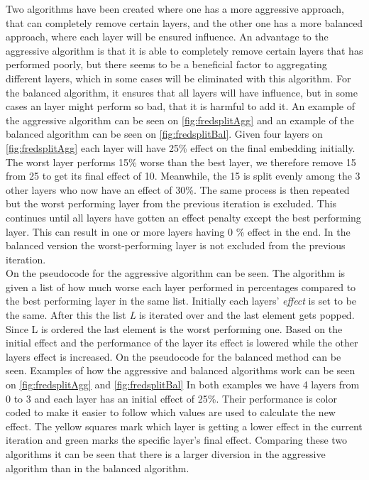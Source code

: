 Two algorithms have been created where one has a more aggressive approach, that can completely remove certain layers, and the other one has a more balanced approach, where each layer will be ensured influence.
An advantage to the aggressive algorithm is that it is able to completely remove certain layers that has performed poorly, but there seems to be a beneficial factor to aggregating different layers, which in some cases will be eliminated with this algorithm.
For the balanced algorithm, it ensures that all layers will have influence, but in some cases an layer might perform so bad, that it is harmful to add it.
An example of the aggressive algorithm can be seen on \autoref{fig:fredsplitAgg} and an example of the balanced algorithm can be seen on \autoref{fig:fredsplitBal}.
Given four layers on \autoref{fig:fredsplitAgg} each layer will have 25\% effect on the final embedding initially.
The worst layer performs 15\% worse than the best layer, we therefore remove 15 from 25 to get its final effect of 10.
Meanwhile, the 15 is split evenly among the 3 other layers who now have an effect of 30\%.
The same process is then repeated but the worst performing layer from the previous iteration is excluded.
This continues until all layers have gotten an effect penalty except the best performing layer.
This can result in one or more layers having 0 \% effect in the end.
In the balanced version the worst-performing layer is not excluded from the previous iteration.
\\
On  the pseudocode for the aggressive algorithm can be seen.
The algorithm is given a list of how much worse each layer performed in percentages compared to the best performing layer in the same list.
Initially each layers' \textit{effect} is set to be the same.
After this the list \textit{L} is iterated over and the last element gets popped.
Since L is ordered the last element is the worst performing one.
Based on the initial effect and the performance of the layer its effect is lowered while the other layers effect is increased.
On  the pseudocode for the balanced method can be seen.
Examples of how the aggressive and balanced algorithms work can be seen on \autoref{fig:fredsplitAgg} and \autoref{fig:fredsplitBal}
In both examples we have 4 layers from 0 to 3 and each layer has an initial effect of 25\%.
Their performance is color coded to make it easier to follow which values are used to calculate the new effect.
The yellow squares mark which layer is getting a lower effect in the current iteration and green marks the specific layer's final effect.
Comparing these two algorithms it can be seen that there is a larger diversion in the aggressive algorithm than in the balanced algorithm.


